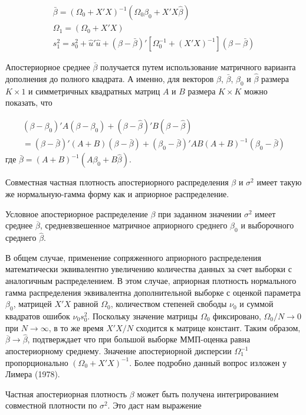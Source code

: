 \begin{multline}
\bar{\beta}=(\Omega_0+X'X)^{-1}(\Omega_0\beta_0+X'X\hat{\beta}) \\
\Omega_1=(\Omega_0+X'X) \\
s_1^2=s_0^2+\hat{u}'\hat{u}+(\beta-\bar{\beta})'[\Omega_0^{-1}+(X'X)^{-1}](\beta-\bar{\beta})
\end{multline}

Апостериорное среднее $\bar{\beta}$ получается путем использование матричного варианта дополнения до полного квадрата. А именно, для векторов $\beta$, $\bar{\beta}$, $\beta_0$ и $\hat{\beta}$ размера $K\times 1$ и симметричных квадратных матриц $A$ и $B$ размера $K\times K$ можно показать, что

\begin{multline}
(\beta-\beta_0)'A(\beta-\beta_0)+(\beta-\hat{\beta})'B(\beta-\hat{\beta}) \\
= (\beta-\bar{\beta})'(A+B)(\beta-\bar{\beta})+(\beta_0-\bar{\beta})'AB(A+B)^{-1}(\beta_0-\bar{\beta})
\end{multline}
где $\bar{\beta}=(A+B)^{-1}(A\beta_0+B\hat{\beta})$.

Совместная частная плотность апостериорного распределения $\beta$ и $\sigma^2$ имеет такую же нормальную-гамма форму как и априорное распределение. 

Условное апостериорное распределение $\beta$ при заданном значении $\sigma^2$ имеет среднее $\overline{\beta}$, средневзвешенное матричное априорного среднего $\beta_0$ и выборочного среднего $\hat{\beta}$.

В общем случае, применение сопряженного априорного распределения математически эквивалентно увеличению количества данных за счет выборки с аналогичным распределением. В этом случае, априорная плотность нормального гамма распределения эквивалентна дополнительной выборке с оценкой параметра $\beta_0$, матрицей $X'X$ равной $\Omega_0$, количеством степеней свободы $\nu_0$ и суммой квадратов ошибок $\nu_{0}s^2_0$. Поскольку значение матрицы $\Omega_0$ фиксировано, $\Omega_0/N{\rightarrow}0$ при $N{\rightarrow}\infty$, в то же время $X'X/N$ сходится к матрице констант. Таким образом, $\overline{\beta} \to\hat{\beta}$, подтверждает что при большой выборке ММП-оценка равна апостериорному среднему. Значение апостериорной дисперсии $\Omega^{-1}_1$ пропорционально $(\Omega_0+X'X)^{-1}$. Более подробно данный вопрос изложен у Лимера (1978). 

Частная апостериорная плотность $\beta$ может быть получена интегрированием совместной плотности по $\sigma^2$. Это даст нам выражение

